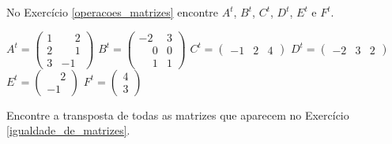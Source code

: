 \documentclass[12pt]{exam}
\begin{document}
\begin{exercicio}
    No Exercício \ref{operacoes_matrizes} encontre $A^t$, $B^t$, $C^t$, $D^t$, $E^t$ e $F^t$.
    \begin{solucao}
        $A^t = \begin{pmatrix}1 & \phantom{-} 2\\2 & \phantom{-} 1\\3 & -1\end{pmatrix}$
        $B^t = \begin{pmatrix}-2 & 3\\\phantom{-} 0 & 0\\\phantom{-} 1 & 1\end{pmatrix}$
        $C^t = \begin{pmatrix}-1 & 2 & 4\end{pmatrix}$
        $D^t = \begin{pmatrix}-2 & 3 & 2\end{pmatrix}$
        $E^t = \begin{pmatrix}\phantom{-} 2\\ -1\end{pmatrix}$
        $F^t = \begin{pmatrix}4\\3\end{pmatrix}$
    \end{solucao}
\end{exercicio}

\begin{exercicio}
    Encontre a transposta de todas as matrizes que aparecem no Exercício \ref{igualdade_de_matrizes}.
\end{exercicio}
\end{document}
